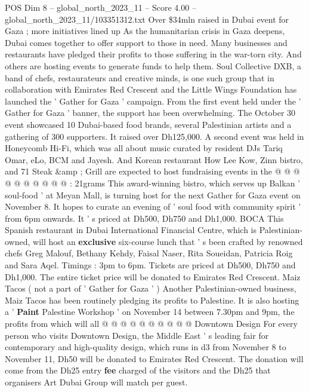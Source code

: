 \begin{textsample}{POS Dim 8 – global\_north\_2023\_11 – Score 4.00 – global\_north\_2023\_11/103351312.txt}  \label{ex:f8_pos_188}
Over \$34mln raised in Dubai event for Gaza ; more initiatives lined up As the humanitarian crisis in Gaza deepens, Dubai comes together to offer support to those in need.
Many businesses and restaurants have pledged their profits to those suffering in the war-torn city.
And others are hosting events to generate funds to help them.
Soul Collective DXB, a band of chefs, restaurateurs and creative minds, is one such group that in collaboration with Emirates Red Crescent and the Little Wings Foundation has launched the ' Gather for Gaza ' campaign.
From the first event held under the ' Gather for Gaza ' banner, the support has been overwhelming.
The October 30 event showcased 10 Dubai-based food brands, several Palestinian artists and a gathering of 300 supporters.
It raised over Dh125,000.
A second event was held in Honeycomb Hi-Fi, which was all about music curated by resident DJs Tariq Omar, eLo, BCM and Jayesh.
And Korean restaurant How Lee Kow, Zinn bistro, and 71 Steak \&amp ; Grill are expected to host fundraising events in the @ @ @ @ @ @ @ @ @ @ : 21grams This award-winning bistro, which serves up Balkan ' soul-food ' at Meyan Mall, is turning host for the next Gather for Gaza event on November 8.
It hopes to curate an evening of ' soul food with community spirit ' from 6pm onwards.
It ' s priced at Dh500, Dh750 and Dh1,000.
BOCA This Spanish restaurant in Dubai International Financial Centre, which is Palestinian-owned, will host an \textbf{exclusive} six-course lunch that ' s been crafted by renowned chefs Greg Malouf, Bethany Kehdy, Faisal Naser, Rita Soueidan, Patricia Roig and Sara Aqel.
Timings : 3pm to 6pm.
Tickets are priced at Dh500, Dh750 and Dh1,000.
The entire ticket price will be donated to Emirates Red Crescent.
Maiz Tacos ( not a part of ' Gather for Gaza ' ) Another Palestinian-owned business, Maiz Tacos has been routinely pledging its profits to Palestine.
It is also hosting a ' \textbf{Paint} Palestine Workshop ' on November 14 between 7.30pm and 9pm, the profits from which will all @ @ @ @ @ @ @ @ @ @ Downtown Design For every person who visits Downtown Design, the Middle East ' s leading fair for contemporary and high-quality design, which runs in d3 from November 8 to November 11, Dh50 will be donated to Emirates Red Crescent.
The donation will come from the Dh25 entry \textbf{fee} charged of the visitors and the Dh25 that organisers Art Dubai Group will match per guest.

\end{textsample}

